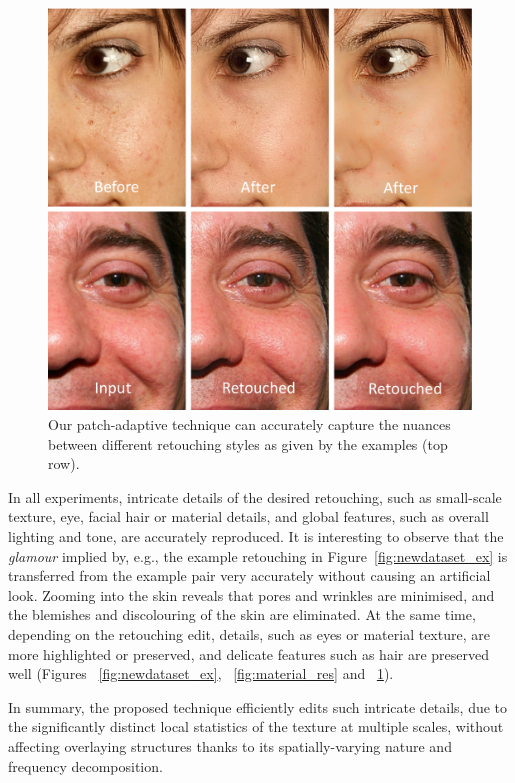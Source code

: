 \begin{figure}[th] %
    \centering
	\includegraphics[width=0.8\columnwidth]{Chapters/detail-retouching-figs/Nuances.pdf}
    \caption{Our patch-adaptive technique can accurately capture the nuances between different
    retouching styles as given by the examples (top row).}
\label{fig:retouchingstyles}
\end{figure}

In all experiments, intricate details of the desired retouching, such as small-scale texture, eye, facial hair or material details, and global features, such as overall lighting and tone, are accurately reproduced. It is interesting to observe that the \emph{glamour} implied by, e.g., the example retouching in Figure~\ref{fig:newdataset_ex} is transferred from the example pair very accurately without causing an artificial look. Zooming into the skin reveals that pores and wrinkles are minimised, and the blemishes and discolouring of the skin are eliminated. At the same time, depending on the retouching edit, details, such as eyes or material texture, are more highlighted or preserved, and delicate features such as hair are preserved well (Figures ~\ref{fig:newdataset_ex}, ~\ref{fig:material_res} and ~\ref{fig:retouchingstyles}). 


In summary, the proposed technique efficiently edits such intricate details, due to the significantly distinct local statistics of the texture at multiple scales, without affecting overlaying structures thanks to its spatially-varying nature and frequency decomposition. 

